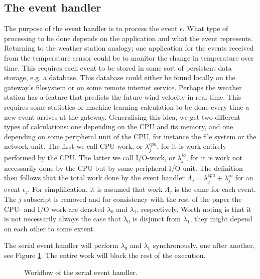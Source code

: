 \subsection{The event handler}

The purpose of the event handler is to process the event $\epsilon$. What type
of processing to be done depends on the application and what the event
represents. Returning to the weather station analogy; one application for the
events received from the temperature sensor could be to monitor the change in
temperature over time. This requires each event to be stored in some sort of
persistent data storage, e.g. a database. This database could either be found
locally on the gateway's filesystem or on some remote internet service. Perhaps
the weather station has a feature that predicts the future wind velocity in
real time. This requires some statistics or machine learning calculation to be
done every time a new event arrives at the gateway. Generalising this idea, we
get two different types of calculations: one depending on the CPU and its
memory, and one depending on some peripheral unit of the CPU, for instance the
file system or the network unit. The first we call CPU-work, or
$\lambda^{cpu}_j$, for it is work entirely performed by the CPU. The latter we
call I/O-work, or $\lambda^{io}_j$, for it is work not necessarily done by the
CPU but by some peripheral I/O unit. The definition then follows that the total
work done by the event handler $\Lambda_j = \lambda^{cpu}_j + \lambda^{io}_j$
for an event $\epsilon_j$. For simplification, it is assumed that work
$\Lambda_j$ is the same for each event. The $j$ subscript is removed and for
consistency with the rest of the paper the CPU- and I/O work are denoted
$\lambda_0$ and $\lambda_1$, respectively. Worth noting is that it is not
necessarily always the case that $\lambda_0$ is disjunct from $\lambda_1$, they
might depend on each other to some extent.

The serial event handler will perform $\lambda_0$ and $\lambda_1$
synchronously, one after another, see Figure \ref{fig:event_handler_serial}.
The entire work will block the rest of the execution.

\begin{figure}[h!]
    \centering

    \caption{Workflow of the serial event handler.}
    \label{fig:event_handler_serial}
\end{figure}

